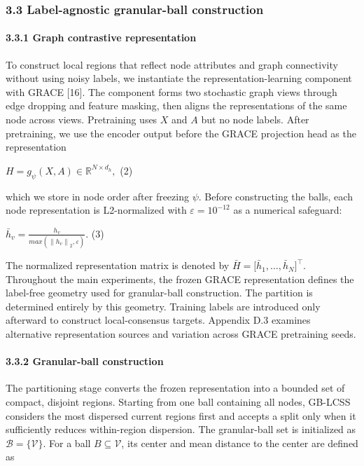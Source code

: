\subsubsection{\texorpdfstring{3.3 Label-agnostic granular-ball construction }{3.3 Label-agnostic granular-ball construction }}\label{label-agnostic-granular-ball-construction}

\paragraph{3.3.1 Graph contrastive representation}\label{graph-contrastive-representation}

To construct local regions that reflect node attributes and graph connectivity without using noisy labels, we instantiate the representation-learning component with GRACE {[}16{]}. The component forms two stochastic graph views through edge dropping and feature masking, then aligns the representations of the same node across views. Pretraining uses \(X\) and \(A\) but no node labels. After pretraining, we use the encoder output before the GRACE projection head as the representation

\(H = g_{\psi}(X,A) \in \mathbb{R}^{N \times d_{h}},\) (2)

which we store in node order after freezing \(\psi\). Before constructing the balls, each node representation is L2-normalized with \(\varepsilon = 10^{- 12}\) as a numerical safeguard:

\({\bar{h}}_{v} = \frac{h_{v}}{max(\left\| h_{v} \right\|_{2},\varepsilon)}.\) (3)

The normalized representation matrix is denoted by \(\bar{H} = \lbrack{\bar{h}}_{1},\ldots,{\bar{h}}_{N}\rbrack^{\top}\). Throughout the main experiments, the frozen GRACE representation defines the label-free geometry used for granular-ball construction. The partition is determined entirely by this geometry. Training labels are introduced only afterward to construct local-consensus targets. Appendix D.3 examines alternative representation sources and variation across GRACE pretraining seeds.

\paragraph{3.3.2 Granular-ball construction}\label{granular-ball-construction}

The partitioning stage converts the frozen representation into a bounded set of compact, disjoint regions. Starting from one ball containing all nodes, GB-LCSS considers the most dispersed current regions first and accepts a split only when it sufficiently reduces within-region dispersion. The granular-ball set is initialized as \(\mathcal{B} = \{\mathcal{V}\}\). For a ball \(B \subseteq \mathcal{V}\), its center and mean distance to the center are defined as

